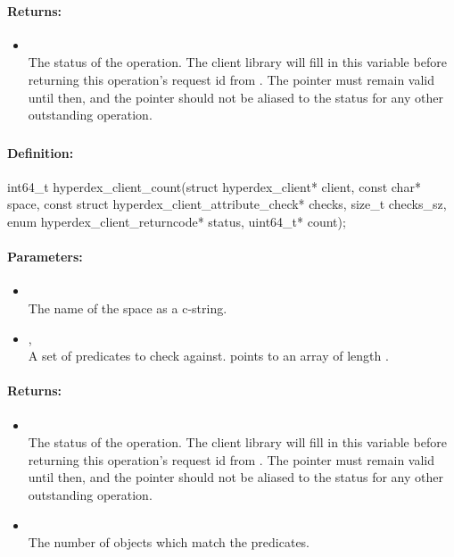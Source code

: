 \paragraph{Returns:}
\begin{itemize}[noitemsep]
\item {}\\
The status of the operation.  The client library will fill in this variable before returning this operation's request id from .  The pointer must remain valid until then, and the pointer should not be aliased to the status for any other outstanding operation.
\end{itemize}

\pagebreak
\subsubsection{}
\label{api:c:count}


\paragraph{Definition:}
\begin{ccode}
int64_t hyperdex_client_count(struct hyperdex_client* client,
        const char* space,
        const struct hyperdex_client_attribute_check* checks, size_t checks_sz,
        enum hyperdex_client_returncode* status,
        uint64_t* count);
\end{ccode}

\paragraph{Parameters:}
\begin{itemize}[noitemsep]
\item {}\\
The name of the space as a c-string.
\item {}, \\
A set of predicates to check against.   points to an array of length .
\end{itemize}

\paragraph{Returns:}
\begin{itemize}[noitemsep]
\item {}\\
The status of the operation.  The client library will fill in this variable before returning this operation's request id from .  The pointer must remain valid until then, and the pointer should not be aliased to the status for any other outstanding operation.
\item {}\\
The number of objects which match the predicates.
\end{itemize}
